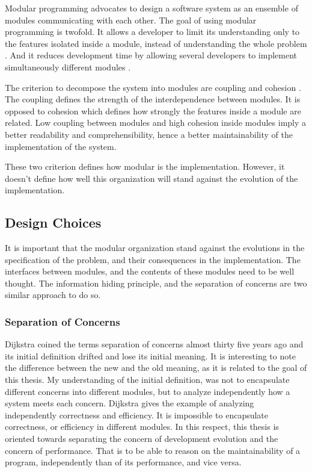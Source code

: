 Modular programming advocates to design a software system as an ensemble of modules communicating with each other.
The goal of using modular programming is twofold.
It allows a developer to limit its understanding only to the features isolated inside a module, instead of understanding the whole problem \cite{Stevens1974}.
And it reduces development time by allowing several developers to implement simultaneously different modules \cite{Wong2009,Cataldo2006}.

The criterion to decompose the system into modules are coupling and cohesion \cite{Stevens1974}.
The coupling defines the strength of the interdependence between modules.
It is opposed to cohesion which defines how strongly the features inside a module are related.
Low coupling between modules and high cohesion inside modules imply a better readability and comprehensibility, hence a better maintainability of the implementation of the system.

These two criterion defines how modular is the implementation.
However, it doesn't define how well this organization will stand against the evolution of the implementation.



\subsection{Design Choices}

It is important that the modular organization stand against the evolutions in the specification of the problem, and their consequences in the implementation.
The interfaces between modules, and the contents of these modules need to be well thought.
The information hiding principle, and the separation of concerns are two similar approach to do so.

\subsubsection{Separation of Concerns}

Dijkstra \cite{Dijkstra1982} coined the terms separation of concerns almost thirty five years ago and its initial definition drifted and lose its initial meaning.
It is interesting to note the difference between the new and the old meaning, as it is related to the goal of this thesis.
My understanding of the initial definition, was not to encapsulate different concerns into different modules, but to analyze independently how a system meets each concern.
Dijkstra gives the example of analyzing independently correctness and efficiency.
It is impossible to encapsulate correctness, or efficiency in different modules.
In this respect, this thesis is oriented towards separating the concern of development evolution and the concern of performance.
That is to be able to reason on the maintainability of a program, independently than of its performance, and vice versa.

